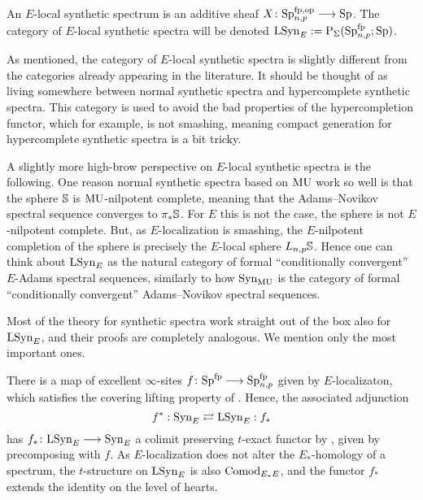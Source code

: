 \begin{definition}
    An $E$-local synthetic spectrum is an additive sheaf $X\: \Sp\np^{\mathrm{fp}, \mathrm{op}}\to \Sp$. The category of $E$-local synthetic spectra will be denoted $\LSynE := \mathrm{P}_\Sigma(\Sp\np\fp;\Sp)$. 
\end{definition}

\begin{remark}
    As mentioned, the category of $E$-local synthetic spectra is slightly different from the categories already appearing in the literature. It should be thought of as living somewhere between normal synthetic spectra and hypercomplete synthetic spectra. This category is used to avoid the bad properties of the hypercompletion functor, which for example, is not smashing, meaning compact generation for hypercomplete synthetic spectra is a bit tricky. 
\end{remark}

\begin{remark}
    A slightly more high-brow perspective on $E$-local synthetic spectra is the following. One reason normal synthetic spectra based on $\MU$ work so well is that the sphere $\S$ is $\MU$-nilpotent complete, meaning that the Adams--Novikov spectral sequence converges to $\pi_*\S$. For $E$ this is not the case, the sphere is not $E$-nilpotent complete. But, as $E$-localization is smashing, the $E$-nilpotent completion of the sphere is precisely the $E$-local sphere $L\np \S$. Hence one can think about $\LSynE$ as the natural category of formal ``conditionally convergent'' $E$-Adams spectral sequences, similarly to how $\Syn_\MU$ is the category of formal ``conditionally convergent'' Adams--Novikov spectral sequences. 
\end{remark}

Most of the theory for synthetic spectra work straight out of the box also for $\LSynE$, and their proofs are completely analogous. We mention only the most important ones.  

There is a map of excellent $\infty$-sites $f\: \Sp\fp\to \Sp\np\fp$ given by $E$-localizaton, which satisfies the covering lifting property of \cite[A.12]{pstragowski_2022}. Hence, the associated adjunction 
\[f^*:\SynE \rightleftarrows \LSynE:f_*\]
has $f_* \: \LSynE \to \SynE$ a colimit preserving $t$-exact functor by \cite[2.22, 2.23]{pstragowski_2022}, given by precomposing with $f$. As $E$-localization does not alter the $E_*$-homology of a spectrum, the $t$-structure on $\LSynE$ is also $\ComodE$, and the functor $f_*$ extends the identity on the level of hearts. 


